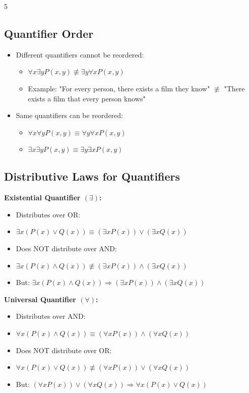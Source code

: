 \documentclass[a4paper,landscape]{article}
\begin{document}
\begin{multicols*}{5}
\subsection*{Quantifier Order}
\begin{itemize}[leftmargin=*, itemsep=0pt]
    \item Different quantifiers cannot be reordered:
    \begin{itemize}[leftmargin=*, itemsep=0pt]
        \item $\forall x \exists y P(x,y) \not\equiv \exists y \forall x P(x,y)$
        \item Example: "For every person, there exists a film they know" $\not\equiv$ "There exists a film that every person knows"
    \end{itemize}
    \item Same quantifiers can be reordered:
    \begin{itemize}[leftmargin=*, itemsep=0pt]
        \item $\forall x \forall y P(x,y) \equiv \forall y \forall x P(x,y)$
        \item $\exists x \exists y P(x,y) \equiv \exists y \exists x P(x,y)$
    \end{itemize}
\end{itemize}

\subsection*{Distributive Laws for Quantifiers}
\textbf{Existential Quantifier $(\exists)$:}
\begin{itemize}[leftmargin=*, itemsep=0pt]
    \item Distributes over OR:
        \item $\exists x(P(x) \vee Q(x)) \equiv (\exists x P(x)) \vee (\exists x Q(x))$
    \item Does NOT distribute over AND:
        \item $\exists x(P(x) \wedge Q(x)) \not\equiv (\exists x P(x)) \wedge (\exists x Q(x))$
    \item But: $\exists x(P(x) \wedge Q(x)) \Rightarrow (\exists x P(x)) \wedge (\exists x Q(x))$
\end{itemize}

\textbf{Universal Quantifier $(\forall)$:}
\begin{itemize}[leftmargin=*, itemsep=0pt]
    \item Distributes over AND:
        \item $\forall x(P(x) \wedge Q(x)) \equiv (\forall x P(x)) \wedge (\forall x Q(x))$
    \item Does NOT distribute over OR:
        \item $\forall x(P(x) \vee Q(x)) \not\equiv (\forall x P(x)) \vee (\forall x Q(x))$
    \item But: $(\forall x P(x)) \vee (\forall x Q(x)) \Rightarrow \forall x(P(x) \vee Q(x))$
\end{itemize}


\end{multicols*}
\end{document}
